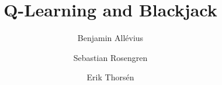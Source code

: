 \documentclass[12pt,a4paper,notitlepage,oneside]{article}
\title{Q-Learning and Blackjack}
\author[1]{Benjamin Allévius}
\author[1]{Sebastian Rosengren}
\author[1]{Erik Thorsén}
\affil[1]{Department of Mathematics, Stockholm University, Sweden}
\date{\vspace{-5ex}}
\begin{document}
\maketitle

\begin{abstract} 
    
\end{abstract}
\thispagestyle{empty}
\clearpage
\setcounter{page}{1}





\end{document}
